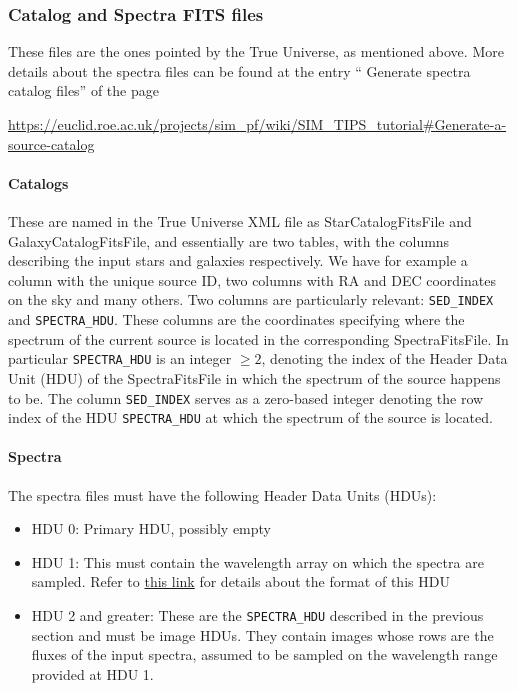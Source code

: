 \subsubsection{Catalog and Spectra FITS files}\label{subsubsec:catalogs_spectra_fits}

These files are the ones pointed by the True Universe, as mentioned above. More details about the spectra files can be found at the entry `` Generate spectra catalog files'' of the page

\begin{center}
\hypertarget{url:spectra_file_redmine}{\url{https://euclid.roe.ac.uk/projects/sim_pf/wiki/SIM_TIPS_tutorial#Generate-a-source-catalog}}
\end{center}

\paragraph{Catalogs}
These are named in the True Universe XML file as StarCatalogFitsFile and GalaxyCatalogFitsFile, and essentially are two tables, with the columns describing the input stars and galaxies respectively. We have for example a column with the unique source ID, two columns with RA and DEC coordinates on the sky and many others. Two columns are particularly relevant: \verb+SED_INDEX+ and \verb+SPECTRA_HDU+. These columns are the coordinates specifying where the spectrum of the current source is located in the corresponding SpectraFitsFile. In particular \verb+SPECTRA_HDU+ is an integer $\geq 2$, denoting the index of the Header Data Unit (HDU) of the SpectraFitsFile in which the spectrum of the source happens to be. The column \verb+SED_INDEX+ serves as a zero-based integer denoting the row index of the HDU \verb+SPECTRA_HDU+ at which the spectrum of the source is located. 

\paragraph{Spectra}

The spectra files must have the following Header Data Units (HDUs):
\begin{itemize}
\item HDU 0: Primary HDU, possibly empty
\item HDU 1: This must contain the wavelength array on which the spectra are sampled. Refer to \hyperlink{url:spectra_file_redmine}{this link} for details about the format of this HDU
\item HDU 2 and greater: These are the \verb+SPECTRA_HDU+ described in the previous section and must be image HDUs. They contain images whose rows are the fluxes of the input spectra, assumed to be sampled on the wavelength range provided at HDU 1.
\end{itemize}
